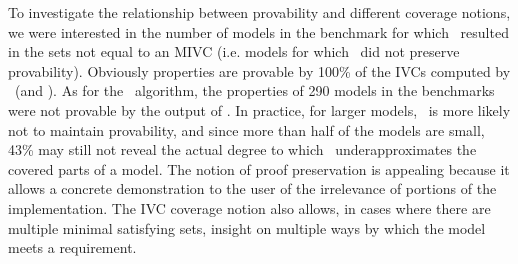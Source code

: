 To investigate the relationship between provability and different coverage notions,
we were interested in the number of models in the benchmark for which
\mustalg\ resulted in the sets not equal to an MIVC (i.e. models for which
\mustalg\ did not preserve provability).
Obviously properties are provable by 100\% of the IVCs computed by \ucalg\ (and \ucbfalg).
As for the \mustalg\ algorithm, the properties of 290 models in the benchmarks were not provable by the output of \mustalg. In practice, for larger models, \mustcov\ is more likely not to maintain provability,
 and since more than half of the models are small, 43\% may still not reveal the actual degree
 to which \mustcov\ underapproximates the covered parts of a model.
  The notion of proof preservation is appealing because it allows a concrete demonstration to the user of the irrelevance of portions of the implementation.  The IVC coverage notion also allows, in cases where there are multiple minimal satisfying sets, insight on multiple ways by which the model meets a requirement.


